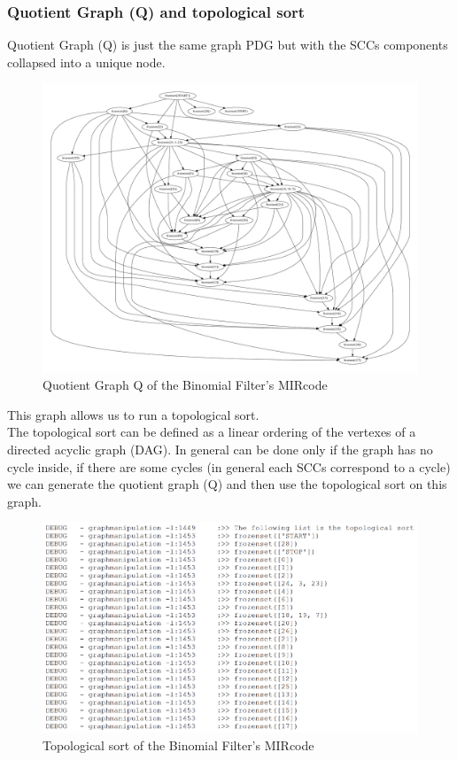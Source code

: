   \subsubsection{Quotient Graph (Q) and topological sort}
  
 
  Quotient Graph (Q) is just the same graph PDG but with the SCCs components collapsed into a unique node. 
  \begin{figure}[h!]
  	\centering
  	\includegraphics[width=\textwidth]{imm/tessa/Q.pdf} 	\caption{Quotient Graph Q of the Binomial Filter's MIRcode
  	} 
  	\label{q}
  \end{figure}
   This graph allows us to run a topological sort.\\
     The topological sort can be defined as a linear ordering of the vertexes of a directed acyclic graph (DAG). In general can be done only if the graph has no cycle inside, if there are some cycles (in general each SCCs correspond to a cycle) we can generate the quotient graph (Q) and then use the topological sort on this graph.
  
   \begin{figure}[h!]
   	\centering
   	\includegraphics[width=\textwidth]{imm/tessa/topsort.png} 	\caption{Topological sort of the Binomial Filter's MIRcode
   	} 
   	\label{topsort}
   \end{figure} 
   \clearpage

